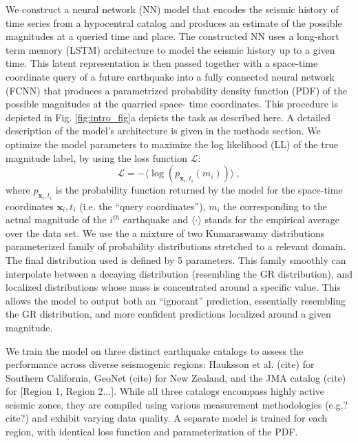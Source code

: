\documentclass[pdflatex]{sn-jnl}
\begin{document}
We construct a neural network (NN) model that encodes the seismic history of time series from a hypocentral catalog and produces an estimate of the possible magnitudes at a queried time and place. The constructed NN uses a long-short term memory (LSTM) architecture to model the seismic history up to a given time. This latent representation is then passed together with  a space-time coordinate query of a future earthquake into a fully connected neural network (FCNN) that produces a parametrized probability density function (PDF) of the possible magnitudes at the quarried space- time coordinates. This procedure is depicted in Fig. \ref{fig:intro_fig}a depicts the task as described here. A detailed description of the model's architecture is given in the methods section. We optimize the model parameters to maximize the log likelihood (LL) of the true magnitude label, by using the loss function $\mathcal{L}$:
\begin{equation}
    \mathcal{L} = -\langle \log{ \left( p_{\textbf{x}_i, t_i} \left( m_i \right) \right) } \rangle\ ,
    \label{eq:loss_function}
\end{equation}
where $p_{\textbf{x}_i, t_i}$ is the probability function returned by the model for the space-time coordinates $\textbf{x}_i, t_i$ (i.e. the ``query coordinates''), $m_i$ the corresponding to the actual magnitude of the $i^{th}$ earthquake and $\langle \cdot\rangle$ stands for the empirical average over the data set. We use the a mixture of two Kumaraswamy distributions \cite{kumaraswamy_generalized_1980} parameterized family of probability distributions stretched to a relevant domain. The final distribution used is defined by 5 parameters. This family smoothly can interpolate between a decaying distribution (resembling the GR distribution), and localized distributions whose mass is concentrated around a specific value. This allows the model to output both an ``ignorant'' prediction, essentially resembling the GR distribution, and more confident predictions localized around a given magnitude.

We train the model on three distinct earthquake catalogs to assess the performance across diverse seismogenic regions: Hauksson et al. (cite) for Southern California, GeoNet (cite) for New Zealand, and the JMA catalog (cite) for [Region 1, Region 2...]. While all three catalogs encompass highly active seismic zones, they are compiled using various measurement methodologies (e.g.? cite?) and exhibit varying data quality. A separate model is trained for each region, with identical loss function and parameterization of the PDF. 
\end{document}
